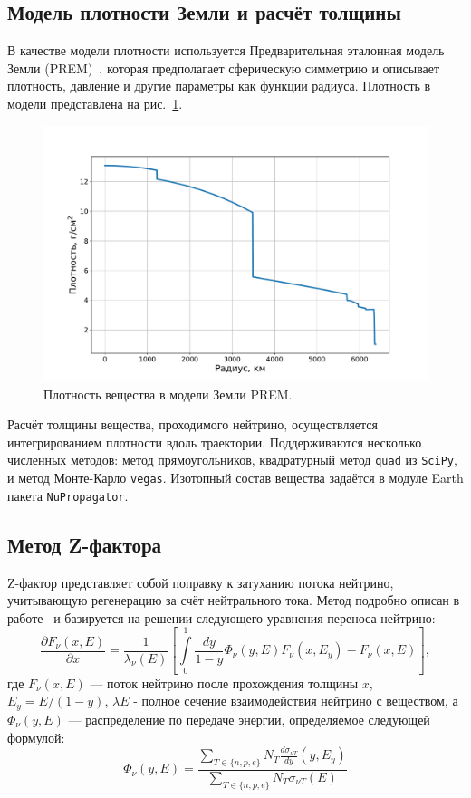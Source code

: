 \subsection{Модель плотности Земли и расчёт толщины}

В качестве модели плотности используется Предварительная эталонная модель Земли (PREM)~\cite{dziewonskiPREM1981}, которая предполагает сферическую симметрию и описывает плотность, давление и другие параметры как функции радиуса. Плотность в модели представлена на рис.~\ref{PREM}.

\begin{figure}[!h]
\centering
\includegraphics[width=\linewidth]{images/NuProp/PREM.pdf}
\caption{Плотность вещества в модели Земли PREM.}
\label{PREM}
\end{figure}

Расчёт толщины вещества, проходимого нейтрино, осуществляется интегрированием плотности вдоль траектории. Поддерживаются несколько численных методов: метод прямоугольников, квадратурный метод \texttt{quad} из \texttt{SciPy}, и метод Монте-Карло \texttt{vegas}. Изотопный состав вещества задаётся в модуле Earth пакета \texttt{NuPropagator}.

\subsection{Метод Z-фактора}

Z-фактор представляет собой поправку к затуханию потока нейтрино, учитывающую регенерацию за счёт нейтрального тока. Метод подробно описан в работе~\cite{naumov1999} и базируется на решении следующего уравнения переноса нейтрино:
\begin{equation}
\frac{\partial F_{\nu}(x,E)}{\partial x} = \frac{1}{\lambda_{\nu}(E)}\left[ \int\limits_0^1\frac{dy}{1-y}\Phi_{\nu}(y,E) F_{\nu}(x,E_y) - F_{\nu}(x,E) \right],
\end{equation}
где $F_{\nu}(x,E)$ — поток нейтрино после прохождения толщины $x$, $E_y = E/(1-y)$, $\lambda{E}$ - полное сечение взаимодействия нейтрино с веществом, а $\Phi_{\nu}(y,E)$ — распределение по передаче энергии, определяемое следующей формулой:
\begin{equation}
    \Phi_{\nu}(y,E) = \frac{\sum\limits_{T\in \{n,p,e\}}N_T\frac{d\sigma_{\nu T}}{dy}(y,E_y)}{\sum\limits_{T\in \{n,p,e\}}N_T\sigma_{\nu T}(E)}
\end{equation}

